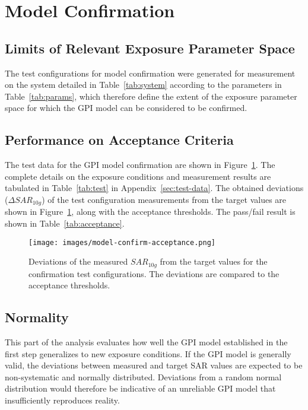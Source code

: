 \documentclass{article}
\begin{document}
\section{Model Confirmation}

\subsection{Limits of Relevant Exposure Parameter Space}
The test configurations for model confirmation were generated for measurement on the system detailed in Table~\ref{tab:system} according to the parameters in Table~\ref{tab:params}, which therefore define the extent of the exposure parameter space for which the GPI model can be considered to be confirmed.



\FloatBarrier
\subsection{Performance on Acceptance Criteria}
The test data for the GPI model confirmation are shown in Figure~\ref{fig:confirm-acc}. The complete details on the exposure conditions and measurement results are tabulated in Table~\ref{tab:test} in Appendix~\ref{sec:test-data}.
The obtained deviations ($\Delta SAR_{10g}$) of the test configuration measurements from the target values are shown in Figure~\ref{fig:confirm-acc}, along with the acceptance thresholds. The pass/fail result is shown in Table~\ref{tab:acceptance}.



\begin{figure}[H] \centering
\texttt{[image: images/model-confirm-acceptance.png]}
\caption{Deviations of the measured $SAR_{10g}$ from the target values for the confirmation test configurations. The deviations are compared to the acceptance thresholds.} \label{fig:confirm-acc}
\end{figure}

\FloatBarrier
\subsection{Normality}

This part of the analysis evaluates how well the GPI model established in the first step generalizes to new exposure conditions. If the GPI model is generally valid, the deviations between measured and target SAR values are expected to be non-systematic and normally distributed. Deviations from a random normal distribution would therefore be indicative of an unreliable GPI model that insufficiently reproduces reality.
\end{document}
